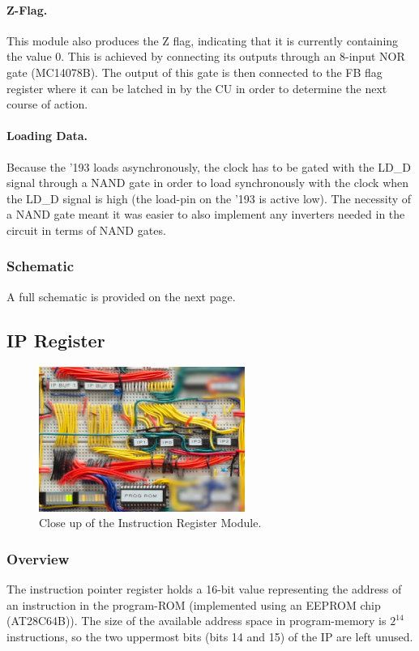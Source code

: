 \paragraph{Z-Flag.} This module also produces the Z flag, indicating that it is currently containing the value 0. This is achieved by connecting its outputs through an 8-input NOR gate (MC14078B). The output of this gate is then connected to the FB flag register where it can be latched in by the CU in order to determine the next course of action.

\paragraph{Loading Data.} Because the '193 loads asynchronously, the clock has to be gated with the LD\_D signal through a NAND gate in order to load synchronously with the clock when the LD\_D signal is high (the load-pin on the '193 is active low). The necessity of a NAND gate meant it was easier to also implement any inverters needed in the circuit in terms of NAND gates.


\subsubsection{Schematic}
A full schematic is provided on the next page.



\subsection{IP Register}
\begin{figure}[H]
  \centering
  \includegraphics[width=0.6\textwidth]{img/ipregistercloseup}
  \caption{Close up of the Instruction Register Module.}
  \label{fig:iregcloseup}
\end{figure}

\subsubsection{Overview}
The instruction pointer register holds a 16-bit value representing the address of an instruction in the program-ROM (implemented using an EEPROM chip (AT28C64B)). The size of the available address space in program-memory is $2^{14}$ instructions, so the two uppermost bits (bits 14 and 15) of the IP are left unused.

